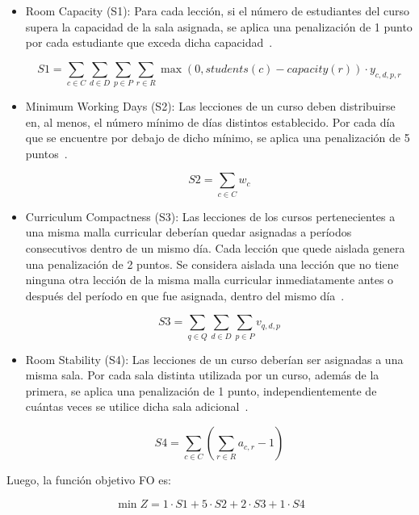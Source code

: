 \documentclass[letter, 10pt]{article}
\begin{document}
\begin{itemize}
    \item Room Capacity (S1): Para cada lecci\'on, si el n\'umero de estudiantes del curso supera la capacidad de la sala asignada, se aplica una penalizaci\'on de 1 punto por cada estudiante que exceda dicha capacidad~\cite{Bonutti2012Benchmarking,DiGaspero2007ITC}.
    
    \[
    S1 = \sum_{c \in C} \sum_{d \in D} \sum_{p \in P} \sum_{r \in R}
    \max(0, students(c) - capacity(r)) \cdot y_{c,d,p,r}
    \]
    
    \item Minimum Working Days (S2): Las lecciones de un curso deben distribuirse en, al menos, el n\'umero m\'inimo de d\'ias distintos establecido. Por cada d\'ia que se encuentre por debajo de dicho m\'inimo, se aplica una penalizaci\'on de 5 puntos~\cite{Bonutti2012Benchmarking,Hao2011LowerBounds,DiGaspero2007ITC}.
    
    \[
    S2 = \sum_{c \in C} w_c
    \]
    
    \item Curriculum Compactness (S3): Las lecciones de los cursos pertenecientes a una misma malla curricular deber\'ian quedar asignadas a per\'iodos consecutivos dentro de un mismo d\'ia. Cada lecci\'on que quede aislada genera una penalizaci\'on de 2 puntos. Se considera aislada una lecci\'on que no tiene ninguna otra lecci\'on de la misma malla curricular inmediatamente antes o despu\'es del per\'iodo en que fue asignada, dentro del mismo d\'ia~\cite{Bonutti2012Benchmarking,Hao2011LowerBounds,Ceschia2023Educational,DiGaspero2007ITC}.
    
    \[
    S3 = \sum_{q \in Q} \sum_{d \in D} \sum_{p \in P} v_{q,d,p}
    \]
    
    \item Room Stability (S4): Las lecciones de un curso deber\'ian ser asignadas a una misma sala. Por cada sala distinta utilizada por un curso, adem\'as de la primera, se aplica una penalizaci\'on de 1 punto, independientemente de cu\'antas veces se utilice dicha sala adicional~\cite{Bonutti2012Benchmarking,Hao2011LowerBounds,Ceschia2023Educational,DiGaspero2007ITC}.
    
    \[
    S4 = \sum_{c \in C} \left(\sum_{r \in R} a_{c,r} - 1\right)
    \]
\end{itemize}

Luego, la funci\'on objetivo FO es:

\[
\min Z = 1 \cdot S1 + 5 \cdot S2 + 2 \cdot S3 + 1 \cdot S4
\]
\end{document}
